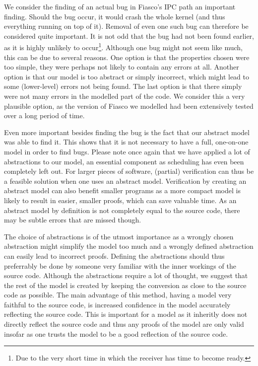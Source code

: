 We consider the finding of an actual bug in Fiasco's IPC path an important finding. Should the bug occur, it would crash the whole kernel (and thus everything running on top of it). Removal of even one such bug can therefore be considered quite important. It is not odd that the bug had not been found earlier, as it is highly unlikely to occur\footnote{Due to the very short time in which the receiver has time to become ready.}. Although one bug might not seem like much, this can be due to several reasons. One option is that the properties chosen were too simple, they were perhaps not likely to contain any errors at all. Another option is that our model is too abstract or simply incorrect, which might lead to some (lower-level) errors not being found. The last option is that there simply were not many errors in the modelled part of the code. We consider this a very plausible option, as the version of Fiasco we modelled had been extensively tested over a long period of time.\emptyline

Even more important besides finding the bug is the fact that our abstract model was able to find it. This shows that it is not necessary to have a full, one-on-one model in order to find bugs. Please note once again that we have applied a lot of abstractions to our model, an essential component as scheduling has even been completely left out. For larger pieces of software, (partial) verification can thus be a feasible solution when one uses an abstract model. Verification by creating an abstract model can also benefit smaller programs as a more compact model is likely to result in easier, smaller proofs, which can save valuable time. As an abstract model by definition is not completely equal to the source code, there may be subtle errors that are missed though.\emptyline

The choice of abstractions is of the utmost importance as a wrongly chosen abstraction might simplify the model too much and a wrongly defined abstraction can easily lead to incorrect proofs. Defining the abstractions should thus preferrably be done by someone very familiar with the inner workings of the source code. Although the abstractions require a lot of thought, we suggest that the rest of the model is created by keeping the conversion as close to the source code as possible. The main advantage of this method, having a model very faithful to the source code, is increased confidence in the model accurately reflecting the source code. This is important for a model as it inheritly does not directly reflect the source code and thus any proofs of the model are only valid insofar as one trusts the model to be a good reflection of the source code.
